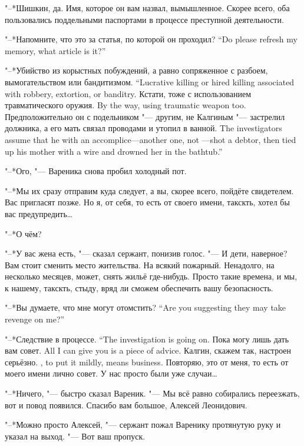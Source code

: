 "--*Шишкин, да.
Имя, которое он вам назвал, вымышленное.
Скорее всего, оба пользовались поддельными паспортами в процессе преступной деятельности.

{"--*Напомните, что это за статья, по которой он проходил?}
{``Do please refresh my memory, what article is it?''}

{"--*Убийство из корыстных побуждений, а равно сопряженное с разбоем, вымогательством или бандитизмом.}
{``Lucrative killing or hired killing associated with robbery, extortion, or banditry.}
{Кстати, тоже с использованием травматического оружия.}
{By the way, using traumatic weapon too.}
{Предположительно он с подельником "--- другим, не Калгиным "--- застрелил должника, а его мать связал проводами и утопил в ванной.}
{The investigators assume that he with an accomplice---another one, not \Kalgin---shot a debtor, then tied up his mother with a wire and drowned her in the bathtub.''}

"--*Ого, "--- Вареника снова пробил холодный пот.

"--*Мы их сразу отправим куда следует, а вы, скорее всего, пойдёте свидетелем.
Вас пригласят позже.
Но я, от себя, то есть от своего имени, такскть, хотел бы вас предупредить\ldots{}

"--*О чём?

"--*У вас жена есть, "--- сказал сержант, понизив голос.
"--- И дети, наверное?
Вам стоит сменить место жительства.
На всякий пожарный.
Ненадолго, на несколько месяцев, может, снять жильё где-нибудь.
Просто такие времена, и мы, к нашему, такскть, стыду, вряд ли сможем обеспечить вашу безопасность.

{"--*Вы думаете, что мне могут отомстить?}
{``Are you suggesting they may take revenge on me?''}

{"--*Следствие в процессе.}
{``The investigation is going on.}
{Пока могу лишь дать вам совет.}
{All I can give you is a piece of advice.}
{Калгин, скажем так, настроен серьёзно.}
{\Kalgin, to put it mildly, means business.}
Повторяю, это от меня, то есть от моего имени лично совет.
У нас просто были уже случаи\ldots{}

"--*Ничего, "--- быстро сказал Вареник.
"--- Мы всё равно собирались переезжать, вот и повод появился.
Спасибо вам большое, Алексей Леонидович.

"--*Можно просто Алексей, "--- сержант пожал Варенику протянутую руку и указал на выход.
"--- Вот ваш пропуск.

\asterism

